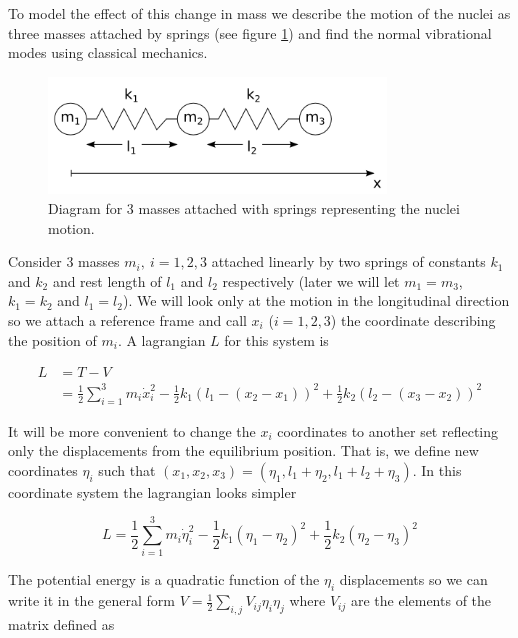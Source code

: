 To model the effect of this change in mass we describe the motion of the nuclei as three masses attached by springs (see figure \ref{fig:3-masses-2-springs}) and find the normal vibrational modes using classical mechanics.

\begin{figure}[ht!]
\centering
\includegraphics[width=0.8\textwidth]{images/3-masses-2-springs-linear.png}
\caption{Diagram for 3 masses attached with springs representing the nuclei motion.}
\label{fig:3-masses-2-springs}
\end{figure}

Consider 3 masses $m_i,\ i=1,2,3$ attached linearly by two springs of constants $k_1$ and $k_2$ and rest length of $l_1$ and $l_2$ respectively (later we will let $ m_1=m_3$, $ k_1=k_2$ and $l_1=l_2$). 
We will look only at the motion in the longitudinal direction so we attach a reference frame and call $ x_i$ ($i=1,2,3$) the coordinate describing the position of $m_i$.
A lagrangian $L$ for this system is 

\begin{align}
L & = T-V\\
  & = \frac{1}{2}\sum_{i=1}^3 m_i \dot{x}_i^2 - \frac{1}{2}k_1(l_1-(x_2-x_1))^2+\frac{1}{2}k_2(l_2-(x_3-x_2))^2
\end{align}

It will be more convenient to change the $x_i$ coordinates to another set reflecting only the displacements from the equilibrium position.
That is, we define new coordinates $\eta_i$ such that $(x_1,x_2,x_3)=(\eta_1,l_1+\eta_2,l_1+l_2+\eta_3)$. 
In this coordinate system the lagrangian looks simpler

\begin{equation}
  L= \frac{1}{2}\sum_{i=1}^3 m_i \dot{\eta}_i^2-\frac{1}{2}k_1(\eta_1-\eta_2)^2+\frac{1}{2}k_2(\eta_2-\eta_3)^2
\end{equation}

The potential energy is a quadratic function of the $\eta_i$ displacements so we can write it in the general form $V=\frac{1}{2}\sum_{i,j}V_{ij}\eta_i\eta_j$ where $V_{ij}$ are the elements of the matrix defined as


